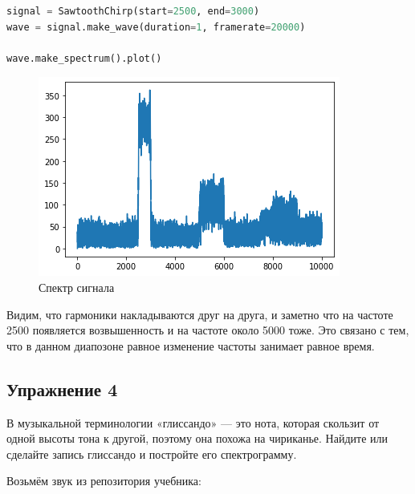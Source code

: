 \begin{lstlisting}[language=Python]
signal = SawtoothChirp(start=2500, end=3000)
wave = signal.make_wave(duration=1, framerate=20000)

wave.make_spectrum().plot()
\end{lstlisting}
\begin{figure}[H]
	\begin{center}
		\includegraphics[scale=1]{fig/lab03/lab03_27_0.png}
		\caption{Спектр сигнала}
	\end{center}
\end{figure}

Видим, что гармоники накладываются друг на друга, и заметно что на частоте 2500 появляется возвышенность и на частоте около 5000 тоже. Это связано с тем, что в данном диапозоне равное изменение частоты занимает равное время.

\subsection{Упражнение 4}

В музыкальной терминологии «глиссандо» — это нота, которая скользит от одной высоты тона к другой, поэтому она похожа на чириканье. Найдите или сделайте запись глиссандо и постройте его спектрограмму.

Возьмём звук из репозитория учебника:


